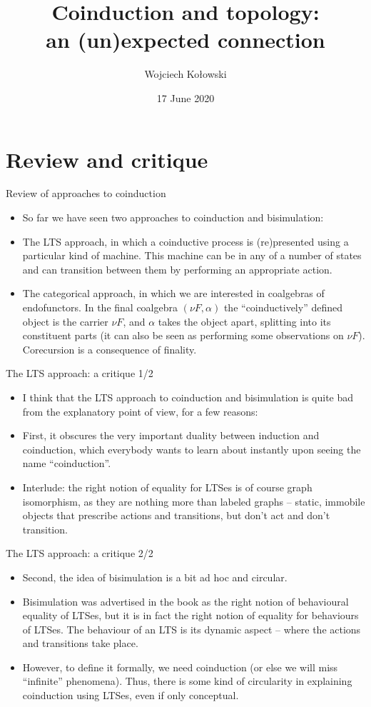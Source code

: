 \documentclass{beamer}
\title{Coinduction and topology:\\an (un)expected connection}
\author{Wojciech Kołowski}
\date{17 June 2020}
\begin{document}
\frame{\titlepage}
\frame{\tableofcontents}

\section{Review and critique}

\begin{frame}{Review of approaches to coinduction}
\begin{itemize}
	\item So far we have seen two approaches to coinduction and bisimulation:
	\item The LTS approach, in which a coinductive process is (re)presented using a particular kind of machine. This machine can be in any of a number of states and can transition between them by performing an appropriate action.
	\item The categorical approach, in which we are interested in coalgebras of endofunctors. In the final coalgebra $(\nu F, \alpha)$ the ``coinductively'' defined object is the carrier $\nu F$, and $\alpha$ takes the object apart, splitting into its constituent parts (it can also be seen as performing some observations on $\nu F$). Corecursion is a consequence of finality.
\end{itemize}
\end{frame}

\begin{frame}{The LTS approach: a critique 1/2}
\begin{itemize}
	\item I think that the LTS approach to coinduction and bisimulation is quite bad from the explanatory point of view, for a few reasons:
	\item First, it obscures the very important duality between induction and coinduction, which everybody wants to learn about instantly upon seeing the name ``coinduction''.
	\item Interlude: the right notion of equality for LTSes is of course graph isomorphism, as they are nothing more than labeled graphs -- static, immobile objects that prescribe actions and transitions, but don't act and don't transition.
\end{itemize}
\end{frame}

\begin{frame}{The LTS approach: a critique 2/2}
\begin{itemize}
	\item Second, the idea of bisimulation is a bit ad hoc and circular.
	\item Bisimulation was advertised in the book as the right notion of behavioural equality of LTSes, but it is in fact the right notion of equality for behaviours of LTSes. The behaviour of an LTS is its dynamic aspect -- where the actions and transitions take place.
	\item However, to define it formally, we need coinduction (or else we will miss ``infinite'' phenomena). Thus, there is some kind of circularity in explaining coinduction using LTSes, even if only conceptual.
\end{itemize}
\end{frame}
\end{document}
